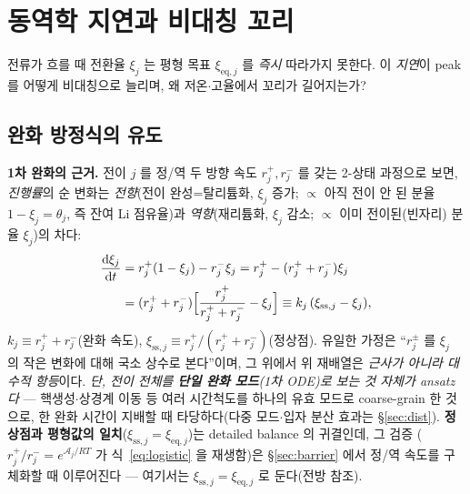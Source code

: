 \documentclass[11pt,a4paper]{article}
\newcommand{\dd}{\mathrm{d}}
\newcommand{\eq}{\mathrm{eq}}
\newcommand{\sstat}{\mathrm{ss}}
\begin{document}
\section{동역학 지연과 비대칭 꼬리}\label{sec:lag}
전류가 흐를 때 전환율 $\xi_j$ 는 평형 목표 $\xi_{\eq,j}$ 를 \emph{즉시} 따라가지 못한다. 이
\emph{지연}이 peak 를 어떻게 비대칭으로 늘리며, 왜 저온$\cdot$고율에서 꼬리가 길어지는가?

\subsection{완화 방정식의 유도}
\textbf{1차 완화의 근거.} 전이 $j$ 를 정/역 두 방향 속도 $r_j^+,r_j^-$ 를 갖는 2-상태 과정으로 보면, \emph{진행률}의
순 변화는 \emph{전향}(전이 완성=탈리튬화, $\xi_j$ 증가; $\propto$ 아직 전이 안 된 분율 $1-\xi_j=\theta_j$, 즉 잔여 Li
점유율)과 \emph{역향}(재리튬화, $\xi_j$ 감소; $\propto$ 이미 전이된(빈자리) 분율 $\xi_j$)의 차다:
\begin{align}
\frac{\dd\xi_j}{\dd t}&=r_j^+(1-\xi_j)-r_j^-\xi_j
=r_j^+-(r_j^++r_j^-)\xi_j\notag\\
&=(r_j^++r_j^-)\Big[\frac{r_j^+}{r_j^++r_j^-}-\xi_j\Big]
\equiv k_j\,(\xi_{\sstat,j}-\xi_j),
\label{eq:relax}
\end{align}
$k_j\equiv r_j^++r_j^-$(완화 속도), $\xi_{\sstat,j}\equiv r_j^+/(r_j^++r_j^-)$(정상점). 유일한 가정은 ``$r_j^\pm$ 를
$\xi_j$ 의 작은 변화에 대해 국소 상수로 본다''이며, 그 위에서 위 재배열은 \emph{근사가 아니라 대수적 항등}이다.
\emph{단, 전이 전체를 \textbf{단일 완화 모드}(1차 ODE)로 보는 것 자체가 ansatz 다} — 핵생성$\cdot$상경계 이동 등
여러 시간척도를 하나의 유효 모드로 coarse-grain 한 것으로, 한 완화 시간이 지배할 때 타당하다(다중 모드$\cdot$입자
분산 효과는 \S\ref{sec:dist}).
\textbf{정상점과 평형값의 일치}($\xi_{\sstat,j}=\xi_{\eq,j}$)는 detailed balance 의 귀결인데, 그 검증
($r_j^+/r_j^-=e^{\mathcal A_j/RT}$ 가 식~\eqref{eq:logistic} 을 재생함)은 \S\ref{sec:barrier} 에서 정/역 속도를
구체화할 때 이루어진다 — 여기서는 $\xi_{\sstat,j}=\xi_{\eq,j}$ 로 둔다(전방 참조).
\end{document}

